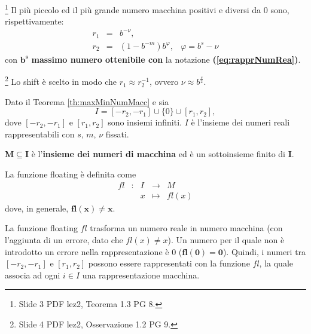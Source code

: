 \begin{theorem}\label{th:maxMinNumMacc}\footnote{Slide 3 PDF lez2, Teorema 1.3 PG 8.}
	Il più piccolo ed il più grande numero macchina positivi e diversi da 0 sono, rispettivamente:
	\begin{equation}\label{eq:minMaxNrPrecMacc}
		\begin{matrix}
			r_1 &=& b^{-\nu},&\\
			r_2 &=& (1-b^{-m})b^\varphi,& \varphi=b^s-\nu
		\end{matrix}
	\end{equation}
	con $\boldsymbol{b^s}$ \textbf{massimo numero ottenibile con} la notazione \textbf{(\ref{eq:rapprNumRea})}.
\end{theorem}

\begin{remark}\footnote{Slide 4 PDF lez2, Osservazione 1.2 PG 9.}
	Lo shift è scelto in modo che $r_1\approx r_2^{-1}$, ovvero $\nu\approx b^{\frac{s}{2}}$.
\end{remark}

\begin{definition}
	Dato il Teorema \ref{th:maxMinNumMacc} e sia 
	\begin{equation}\label{eq:insDomFFloaPoint}
		I=[-r_2,-r_1]\cup \{0\}\cup [r_1,r_2],
	\end{equation}
	dove $[-r_2,-r_1]$ e $[r_1,r_2]$ sono insiemi infiniti. $I$ è l'insieme dei numeri reali rappresentabili con $s,\,m,\,\nu$ fissati.
\end{definition}

\begin{definition}
	$\boldsymbol{M\subseteq I}$ è l'\textbf{insieme dei numeri di macchina} ed è un sottoinsieme finito di $\boldsymbol I$.
\end{definition}

\begin{definition}
	La funzione floating è definita come
	\begin{equation*}
		\begin{matrix}
			fl&:&I&\rightarrow& M\\
			&&x&\mapsto& fl(x)
		\end{matrix}
	\end{equation*}
	dove, in generale, $\boldsymbol{fl(x)\neq x}$. 
\end{definition}

La funzione floating $fl$ trasforma un numero reale in numero macchina (con l'aggiunta di un errore, dato che $fl(x)\neq x$). Un numero per il quale non è introdotto un errore nella rappresentazione è 0 ($\boldsymbol{fl(0)=0}$). Quindi, i numeri tra $[-r_2,-r_1]$ e $[r_1,r_2]$ possono essere rappresentati con la funzione $fl$, la quale associa ad ogni $i\in I$ una rappresentazione macchina. 

